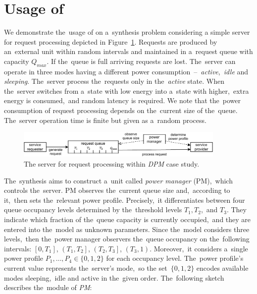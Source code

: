 \section{Usage of \toolname{}}
We demonstrate the~usage of \toolname{} on a~synthesis problem considering a simple server for request processing depicted in Figure~\ref{fig:dpm}. 
Requests are produced by an~external unit within random intervals and maintained in a~request queue with capacity $Q_{max}$.
If the~queue is full arriving requests are lost.
The~server can operate in three modes having a different power consumption \,--\, \textit{active},~\textit{idle} and \textit{sleeping}.
The~server process the~requests only in the~\textit{active} state.
When the~server switches from a~state with low energy into a~state with higher,~extra energy is consumed,~and random latency is required.
We note that the~power consumption of request processing depends on the~current size of the~queue.
The~server operation time is finite but given as a~random process.

\begin{figure}[h!]
\centering
\includegraphics[width=0.9\textwidth]{figures/dpm.pdf}
\caption{The server for request processing within \emph{DPM} case study.}%
\label{fig:dpm}%
\end{figure}

The~synthesis aims to construct a~unit called \textit{power manager} (PM),~which controls the~server.
PM observes the~current queue size and,~according to it,~then sets the~relevant power profile.
Precisely,~it differentiates between four queue occupancy levels determined by the~threshold levels $T_1,T_2$,~and $T_3$.
They indicate which fraction of the~queue capacity is currently occupied,~and they are entered into the~model as unknown parameters.
Since the~model considers three levels,~then the~power manager observers the~queue occupancy on the~following intervals: $\left[0, T_1 \right]$, $\left(T_1, T_2 \right]$, $\left(T_2, T_3 \right]$, $\left(T_3, 1 \right)$.
Moreover,~it considers a~single power profile $P_1,\dots,P_4 \in \{0,1,2\}$ for each occupancy level.
The~power profile's current value represents the~server's mode,~so the set~$\{0,1,2\}$ encodes available modes sleeping,~idle and active in the~given order.
The~following sketch describes the~module of \textit{PM}:

